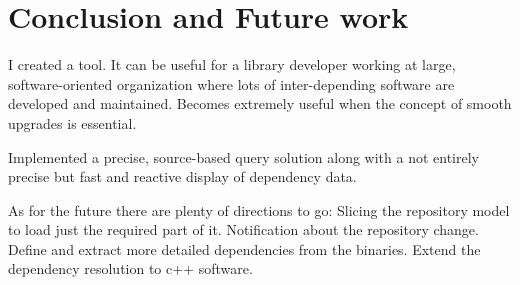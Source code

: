 \chapter{Conclusion and Future work}

I created a tool.
It can be useful for a library developer working at large, software-oriented organization where lots of inter-depending software are developed and maintained. 
Becomes extremely useful when the concept of smooth upgrades is essential.

Implemented a precise, source-based  query solution along with a not entirely precise but fast and reactive display of dependency data. 

As for the future there are plenty of directions to go:
Slicing the repository model to load just the required part of it. 
Notification about the repository change. 
Define and extract more detailed dependencies from the binaries.
Extend the dependency resolution to c++ software. 

